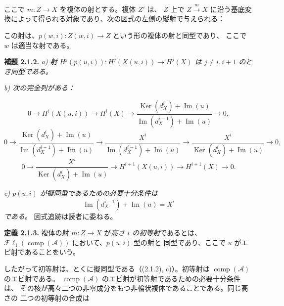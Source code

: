 \clearpage
{}%
\begingroup\small\setlength{\parskip}{0pt}\setlength{\emergencystretch}{1.5em}
\setlength{\abovedisplayskip}{4pt plus 2pt minus 2pt}%
\setlength{\belowdisplayskip}{4pt plus 2pt minus 2pt}%

ここで $m\colon Z\longrightarrow X$ を複体の射とする。複体 $Z'$ は、
$Z$ 上で $Z\xrightarrow{m}X$ に沿う基底変換によって得られる対象であり、次の図式の左側の縦射で与えられる：

\begin{center}
\end{center}
この射は、$p(w,i)\colon Z(w,i)\longrightarrow Z$ という形の複体の射と同型であり、
ここで $w$ は適当な射である。

\medskip\noindent\textbf{補題 2.1.2.}\quad
\textit{a) 射
$H^j(p(u,i))\colon H^j(X(u,i))\longrightarrow H^j(X)$ は
$j\neq i,i+1$ のとき同型である。}

\noindent\textit{b) 次の完全列がある：}

\[
0\longrightarrow H^i(X(u,i))\longrightarrow H^i(X)
\longrightarrow
\frac{\operatorname{Ker}(d_X^i)+\operatorname{Im}(u)}
     {\operatorname{Im}(d_X^{i-1})+\operatorname{Im}(u)}
\longrightarrow0,
\]
\[
0\longrightarrow
\frac{\operatorname{Ker}(d_X^i)+\operatorname{Im}(u)}
     {\operatorname{Im}(d_X^{i-1})+\operatorname{Im}(u)}
\longrightarrow
\frac{X^i}{\operatorname{Im}(d_X^{i-1})+\operatorname{Im}(u)}
\longrightarrow
\frac{X^i}{\operatorname{Ker}(d_X^i)+\operatorname{Im}(u)}
\longrightarrow0,
\]
\[
0\longrightarrow
\frac{X^i}{\operatorname{Ker}(d_X^i)+\operatorname{Im}(u)}
\longrightarrow H^{i+1}(X(u,i))\longrightarrow H^{i+1}(X)
\longrightarrow0.
\]

\noindent\textit{c) $p(u,i)$ が擬同型であるための必要十分条件は}
\[
\operatorname{Im}(d_X^{i-1})+\operatorname{Im}(u)=X^i
\]
\textit{である。}
図式追跡は読者に委ねる。

\medskip\noindent\textbf{定義 2.1.3.}\quad
複体の射 $m\colon Z\longrightarrow X$ が\emph{高さ $i$ の初等射}であるとは、
$\mathcal{F}\ell_1(\operatorname{comp}(\mathcal A))$ において、$p(u,i)$ 型の射と
同型であり、ここで $u$ がエピ射であることをいう。

したがって初等射は、とくに擬同型である（(2.1.2), c)）。初等射は
$\operatorname{comp}(\mathcal A)$ のエピ射である。
$\operatorname{comp}(\mathcal A)$ のエピ射が初等射であるための必要十分条件は、
その核が高々二つの非零成分をもつ非輪状複体であることである。同じ高さの
二つの初等射の合成は
\endgroup
